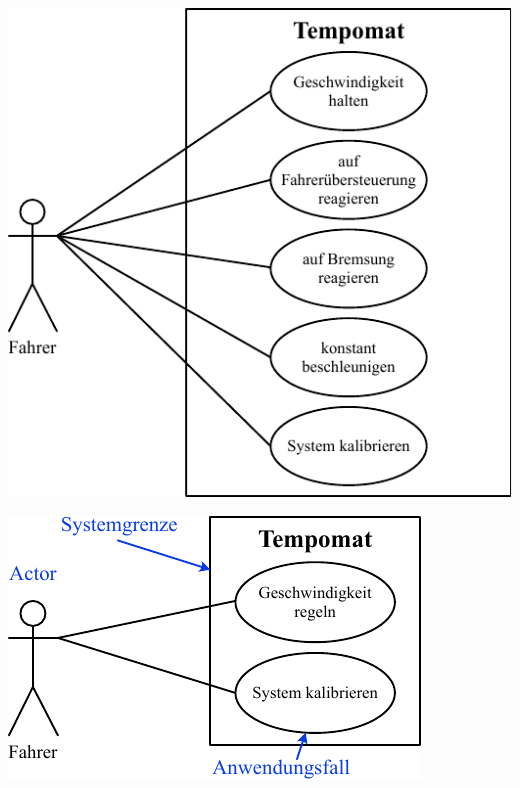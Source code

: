 \begin{minipage}[t]{0.4\columnwidth}

    \vspace{0.1cm}

    \includegraphics[width=\columnwidth]{images/use-case-diagramm_schlecht.pdf}
\end{minipage}
\hfill
\begin{minipage}[t]{0.48\columnwidth}

    \vspace{0.1cm}

    \includegraphics[width=\columnwidth]{images/use-case-diagramm_besser.pdf}
\end{minipage}


